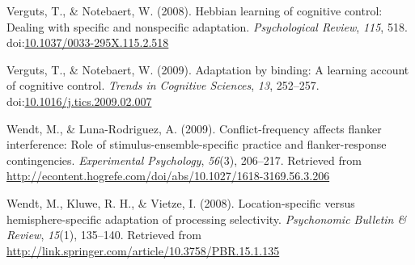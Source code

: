 \documentclass[english,,man,floatsintext]{apa6}
\begin{document}
\hypertarget{ref-verguts_hebbian_2008}{}
Verguts, T., \& Notebaert, W. (2008). Hebbian learning of cognitive
control: Dealing with specific and nonspecific adaptation.
\emph{Psychological Review}, \emph{115}, 518.
doi:\href{https://doi.org/10.1037/0033-295X.115.2.518}{10.1037/0033-295X.115.2.518}

\hypertarget{ref-verguts_adaptation_2009}{}
Verguts, T., \& Notebaert, W. (2009). Adaptation by binding: A learning
account of cognitive control. \emph{Trends in Cognitive Sciences},
\emph{13}, 252--257.
doi:\href{https://doi.org/10.1016/j.tics.2009.02.007}{10.1016/j.tics.2009.02.007}

\hypertarget{ref-wendt_conflict-frequency_2009}{}
Wendt, M., \& Luna-Rodriguez, A. (2009). Conflict-frequency affects
flanker interference: Role of stimulus-ensemble-specific practice and
flanker-response contingencies. \emph{Experimental Psychology},
\emph{56}(3), 206--217. Retrieved from
\url{http://econtent.hogrefe.com/doi/abs/10.1027/1618-3169.56.3.206}

\hypertarget{ref-wendt_location-specific_2008}{}
Wendt, M., Kluwe, R. H., \& Vietze, I. (2008). Location-specific versus
hemisphere-specific adaptation of processing selectivity.
\emph{Psychonomic Bulletin \& Review}, \emph{15}(1), 135--140. Retrieved
from \url{http://link.springer.com/article/10.3758/PBR.15.1.135}

\endgroup
\end{document}
